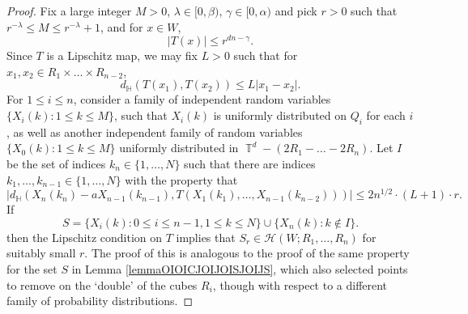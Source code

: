 \documentclass[dvipsnames,letterpaper,12pt]{article}
\numberwithin{equation}{section}
\DeclareMathOperator{\TT}{\mathbb{T}}
\numberwithin{theorem}{section}
\begin{document}
\begin{proof}
    Fix a large integer $M > 0$, $\lambda \in [0,\beta)$, $\gamma \in [0,\alpha)$ and pick $r > 0$ such that $r^{-\lambda} \leq M \leq r^{-\lambda} + 1$, and for $x \in W$,
    \[ |T(x)| \leq r^{dn - \gamma}. \]
    Since $T$ is a Lipschitz map, we may fix $L > 0$ such that for $x_1,x_2 \in R_1 \times \dots \times R_{n-2}$,
    \[ d_{\mathbb{H}}(T(x_1), T(x_2)) \leq L |x_1 - x_2|. \]
    For $1 \leq i \leq n$, consider a family of independent random variables $\{ X_i(k): 1 \leq k \leq M \}$, such that $X_i(k)$ is uniformly distributed on $Q_i$ for each $i$, as well as another independent family of random variables $\{ X_0(k): 1 \leq k \leq M \}$ uniformly distributed in $\TT^d - (2R_1 - \dots - 2R_n)$. Let $I$ be the set of indices $k_n \in \{ 1, \dots, N \}$ such that there are indices $k_1,\dots,k_{n-1} \in \{ 1, \dots, N \}$ with the property that
    \begin{equation}
        |d_{\mathbb{H}}(X_n(k_n) - a X_{n-1}(k_{n-1}), T(X_1(k_1), \dots, X_{n-1}(k_{n-2})))| \leq 2 n^{1/2} \cdot (L+1) \cdot r.
    \end{equation}
    If
    \[ S = \{ X_i(k) : 0 \leq i \leq n-1, 1 \leq k \leq N \} \cup \{ X_n(k): k \not \in I \}. \]
    then the Lipschitz condition on $T$ implies that $S_r \in \mathcal{H}(W;R_1,\dots,R_n)$ for suitably small $r$. The proof of this is analogous to the proof of the same property for the set $S$ in Lemma \ref{lemmaOIOICJOIJOISJOIJS}, which also selected points to remove on the `double' of the cubes $R_i$, though with respect to a different family of probability distributions.


\end{proof}
\end{document}
